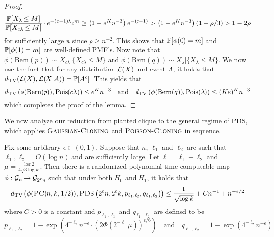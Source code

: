\documentclass[11pt]{article}
\begin{document}
\begin{proof}
$$\frac{\mathbb{P}[X_\lambda \le M]}{\mathbb{P}[X_{c\lambda} \le M]} \cdot e^{-(c - 1)\lambda} c^m \ge \left(1 - e^K n^{-3} \right) e^{-(c - 1)} >  \left(1 - e^K n^{-3} \right) \left( 1 - \rho/3 \right) > 1 - 2\rho$$
for sufficiently large $n$ since $\rho \ge n^{-2}$. This shows that $\mathbb{P}[\phi(0) = m]$ and $\mathbb{P}[\phi(1) = m]$ are well-defined PMF's. Now note that $\phi(\text{Bern}(p)) \sim X_{c\lambda} | \{X_{c\lambda} \le M\}$ and $\phi(\text{Bern}(q)) \sim X_{\lambda} | \{X_{\lambda} \le M\}$. We now use the fact that for any distribution $\mathcal{L}(X)$ and event $A$, it holds that $d_{\text{TV}}(\mathcal{L}(X), \mathcal{L}(X|A)) = \mathbb{P}[A^c]$. This yields that
$$d_{\text{TV}}\left(\phi(\text{Bern}(p)), \text{Pois}(c\lambda) \right) \le e^K n^{-3} \quad \text{and} \quad d_{\text{TV}}\left(\phi(\text{Bern}(q)), \text{Pois}(\lambda) \right) \le (Ke)^K n^{-3}$$
which completes the proof of the lemma.
\end{proof}

We now analyze our reduction from planted clique to the general regime of PDS, which applies $\textsc{Gaussian-Cloning}$ and $\textsc{Poisson-Cloning}$ in sequence.

\begin{lemma}
Fix some arbitrary $\epsilon \in (0, 1)$. Suppose that $n$, $\ell_1$ and $\ell_2$ are such that $\ell_1, \ell_2 = O(\log n)$ and are sufficiently large. Let $\ell = \ell_1 + \ell_2$ and $\mu = \frac{\log 2}{4 \sqrt{3 \log k}}$. Then there is a randomized polynomial time computable map $\phi : \mathcal{G}_n \to \mathcal{G}_{2^\ell n}$ such that under both $H_0$ and $H_1$, it holds that
$$d_{\text{TV}}\left( \phi(\textsc{PC}(n, k, 1/2)), \textsc{PDS}\left(2^\ell n, 2^\ell k, p_{\ell_1, \ell_2}, q_{\ell_1, \ell_2} \right) \right) \le \frac{1}{\sqrt{\log k}} + Cn^{-1} + n^{-\epsilon/2}$$
where $C > 0$ is a constant and $p_{\ell_1, \ell_2}$ and $q_{\ell_1, \ell_2}$ are defined to be
$$p_{\ell_1, \ell_2} = 1 - \exp\left( 4^{-\ell_2} n^{-\epsilon} \cdot \left( 2 \Phi\left(2^{-\ell_1} \mu \right) \right)^{\epsilon/6} \right) \quad \text{and} \quad q_{\ell_1, \ell_2} = 1 - \exp\left( 4^{-\ell_2} n^{-\epsilon} \right)$$
\end{lemma}
\end{document}
